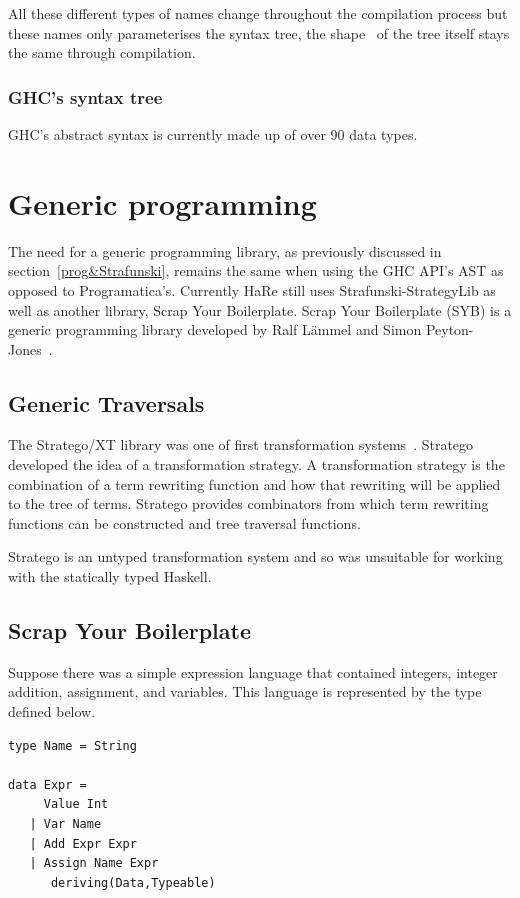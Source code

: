 All these different types of names change throughout the compilation process but these names only parameterises the syntax tree, the shape~ of the tree itself stays the same through compilation. 

\subsubsection{GHC's syntax tree}
GHC's abstract syntax is currently made up of over 90 data types. 


\section{Generic programming}\label{genProg}
The need for a generic programming library, as previously discussed in section~\ref{prog&Strafunski}, remains the same when using the GHC API's AST as opposed to Programatica's. Currently HaRe still uses Strafunski-StrategyLib as well as another library, Scrap Your Boilerplate. Scrap Your Boilerplate (SYB) is a generic programming library developed by Ralf L{\"a}mmel and Simon Peyton-Jones~\citep{syb}.
\subsection{Generic Traversals}
The Stratego/XT library was one of first transformation systems~\citep{stratego}. Stratego developed the idea of a transformation strategy. A transformation strategy is the combination of a term rewriting function and how that rewriting will be applied to the tree of terms. Stratego provides combinators from which term rewriting functions can be constructed and tree traversal functions\citep{stratego}.

Stratego is an untyped transformation system and so was unsuitable for working with the statically typed Haskell.  
\subsection{Scrap Your Boilerplate}\label{syb}

	Suppose there was a simple expression language that contained integers, integer addition, assignment, and variables. This language is represented by the type defined below.
	
	\begin{verbatim}
type Name = String

data Expr =
     Value Int
   | Var Name
   | Add Expr Expr
   | Assign Name Expr
      deriving(Data,Typeable)
	\end{verbatim}
	
